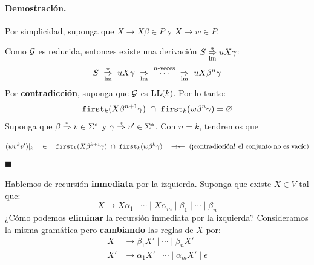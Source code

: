    \paragraph{Demostración.} Por simplicidad, suponga que $X \to X\beta \in P$ y $X \to w \in P$. \medbreak

    Como $\mathcal{G}$ es reducida, entonces existe una derivación $S \underset{\mathrm{lm}}{\overset{*}{\Rightarrow}} uX\gamma$:
    $$
        S \ \overunder{\Rightarrow}{\mathrm{lm}}{*} \ uX\gamma \ \overunder{\Rightarrow}{\mathrm{lm}}{} \ \overset{n\text{-veces}}{\cdots}\ \overunder{\Rightarrow}{\mathrm{lm}}{} \ uX \beta^n\gamma
    $$
    Por \textbf{contradicción}, suponga que $\mathcal{G}$ es $\text{LL}(k)$. Por lo tanto:
    $$
        \texttt{first}_k(X\beta^{n+1}\gamma) \ \cap \ \texttt{first}_k(w \beta^n \gamma) = \varnothing
    $$
    Suponga que $\beta \underset{}{\overset{*}{\Rightarrow}} v \in \Sigma^*$ y $\gamma \underset{}{\overset{*}{\Rightarrow}} v' \in \Sigma^*$. Con $n = k$, tendremos que
    $$
        (wv^k v')|_k \quad \in \quad \texttt{first}_k(X\beta^{k+1}\gamma) \ \cap \ \texttt{first}_k(w \beta^k\gamma) \quad \rightarrow\leftarrow \text{ (¡contradicción! el conjunto no es vacío)}
    $$
    \hfill $\blacksquare$ \bigbreak

    Hablemos de recursión \textbf{inmediata} por la izquierda. Suponga que existe $X \in V$ tal que:
    $$
        X \to X \alpha_1 \mid \cdots \mid X \alpha_m \mid \beta_1 \mid \cdots \mid \beta_n
    $$
    ¿Cómo podemos \textbf{eliminar} la recursión inmediata por la izquierda? Consideramos la misma gramática pero \textbf{cambiando} las reglas de $X$ por:
    \begin{align*}
        X  & \to \beta_1 X' \mid \cdots \mid \beta_n X'                 \\
        X' & \to \alpha_1 X' \mid \cdots \mid \alpha_m X' \mid \epsilon
    \end{align*}


